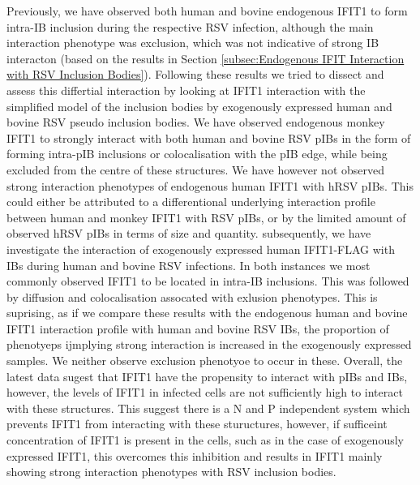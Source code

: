 Previously, we have observed both human and bovine endogenous IFIT1 to form intra-IB inclusion during the respective RSV infection, although the main interaction phenotype was exclusion, which was not indicative of strong IB interacton (based on the results in Section \ref{subsec:Endogenous IFIT Interaction with RSV Inclusion Bodies}). Following these results we tried to dissect and assess this differtial interaction by looking at IFIT1 interaction with the simplified model of the inclusion bodies by exogenously expressed human and bovine RSV pseudo inclusion bodies. We have observed endogenous monkey IFIT1 to strongly interact with both human and bovine RSV pIBs in the form of forming intra-pIB inclusions or colocalisation with the pIB edge, while being excluded from the centre of these structures. We have however not observed strong interaction phenotypes of endogenous human IFIT1 with hRSV pIBs. This could either be attributed to a differentional underlying interaction profile between human and monkey IFIT1 with RSV pIBs, or by the limited amount of observed hRSV pIBs in terms of size and quantity. subsequently, we have investigate the interaction of exogenously expressed human IFIT1-FLAG with IBs during human and bovine RSV infections. In both instances we most commonly observed IFIT1 to be located in intra-IB inclusions. This was followed by diffusion and colocalisation assocated with exlusion phenotypes. This is suprising, as if we compare these results with the endogenous human and bovine IFIT1 interaction profile with human and bovine RSV IBs, the proportion of phenotyeps ijmplying strong interaction is increased in the exogenously expressed samples. We neither observe exclusion phenotyoe to occur in these. Overall, the latest data sugest that IFIT1 have the propensity to interact with pIBs and IBs, however, the levels of IFIT1 in infected cells are not sufficiently high to interact with these structures. This suggest there is a N and P independent system which prevents IFIT1 from interacting with these stuructures, however, if sufficeint concentration of IFIT1 is present in the cells, such as in the case of exogenously expressed IFIT1, this overcomes this inhibition and results in IFIT1 mainly showing strong interaction phenotypes with RSV inclusion bodies.

